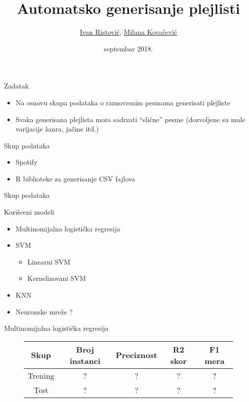 \documentclass{beamer}
\title{Automatsko generisanje plejlisti}
\author{\href{mailto:mi14031@matf.bg.ac.rs}{Ivan Ristović}, \href{mailto:mi14042@matf.bg.ac.rs}{Milana Kovačević}
}
\date{septembar 2018.}
\begin{document}
\begin{frame}
    \titlepage
\end{frame}

\begin{frame}{Zadatak}
    \begin{itemize}
        \item Na osnovu skupa podataka o raznovrsnim pesmama generisati plejliste
        \item Svaka generisana plejlista mora sadrzati ``sli\v{c}ne'' pesme (dozvoljene su male varijacije \v{z}anra, ja\v{c}ine itd.)
    \end{itemize}
\end{frame}

\begin{frame}{Skup podataka}
    \begin{itemize}
        \item Spotify
        \item R biblioteke za generisanje CSV fajlova
    \end{itemize}
\end{frame}

\begin{frame}{Skup podataka}
\end{frame}

\begin{frame}{Kori\v{s}ceni modeli}
    \begin{itemize}
        \item Multinomijalna logisti\v{c}ka regresija
        \item SVM
        \begin{itemize}
            \item Linearni SVM
            \item Kernelizovani SVM
        \end{itemize}
        \item KNN
        \item Neuronske mre\v{z}e ?
    \end{itemize}
\end{frame}

\begin{frame}[fragile]{Multinomijalna logisti\v{c}ka regresija}
    \begin{figure}[!h]
    \centering
    \begin{tabular}{ | c | c | c | c | c |}
        \hline
        Skup & Broj instanci & Preciznost & R2 skor & F1 mera \\
        \hline
        Trening & ? & ? & ? & ? \\
        Test & ? & ? & ? & ? \\
        \hline
    \end{tabular}
    \end{figure}
\end{frame}
\end{document}
